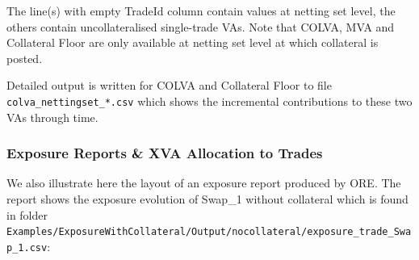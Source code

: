 The line(s) with empty TradeId column contain values at netting set level, the others contain uncollateralised
single-trade VAs.  Note that COLVA, MVA and Collateral Floor are only available at netting set level at which collateral
is posted.

\medskip
Detailed output is written for COLVA and Collateral Floor to file {\tt colva\_nettingset\_*.csv} which shows the
incremental contributions to these two VAs through time.


\subsubsection*{Exposure Reports \& XVA Allocation to Trades}

We also illustrate here the layout of an exposure report produced by ORE. The report shows the exposure evolution of
Swap\_1 without collateral which is found in folder \\
{\tt Examples/ExposureWithCollateral/Output/nocollateral/exposure\_trade\_Swap\_1.csv}:

\begin{center}
\end{center}

